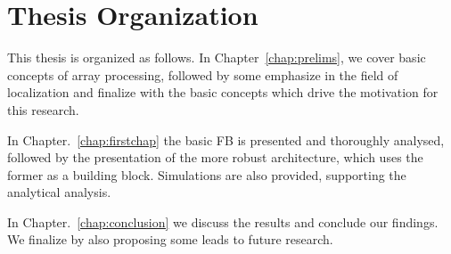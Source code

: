 \section{Thesis Organization}
\par This thesis is organized as follows.
In Chapter~\ref{chap:prelims}, we cover basic concepts of array processing, followed by some emphasize in the field of localization and finalize with the basic concepts which drive the motivation for this research.
\par In Chapter.~\ref{chap:firstchap} the basic FB is presented and thoroughly analysed, followed by the presentation of the more robust architecture, which uses the former as a building block.
Simulations are also provided, supporting the analytical analysis.
\par In Chapter.~\ref{chap:conclusion} we discuss the results and conclude our findings. We finalize by also proposing some leads to future research.
